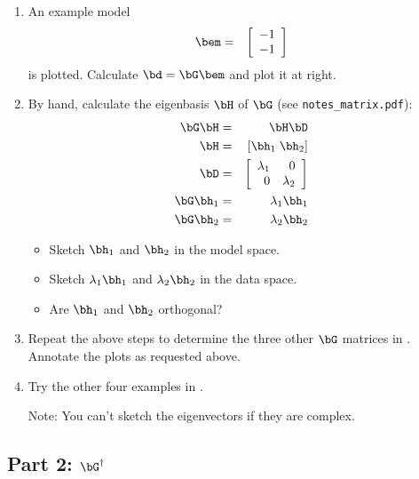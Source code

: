 \documentclass[11pt,titlepage,fleqn]{article}
\begin{document}
\begin{enumerate}
\item An example model
%
\begin{eqnarray}
\bem  &=& \left[ \begin{array}{c} -1 \\ -1 \end{array} \right]
\end{eqnarray}
%
is plotted. Calculate $\bd = \bG\bem$ and plot it at right.

\item By hand, calculate the eigenbasis $\bH$ of $\bG$ (see \verb+notes_matrix.pdf+):
%
\begin{eqnarray}
\bG\bH  &=& \bH \bD
\\
\bH &=& [\bh_1\;\bh_2]
\\
\bD &=& \left[ \begin{array}{rr}
     \lambda_1  &  0  \\
     0  &  \lambda_2  \\
\end{array} \right]
\\
\bG\bh_1 &=& \lambda_1\bh_1
\\
\bG\bh_2 &=& \lambda_2\bh_2
\end{eqnarray}
%
\begin{itemize}
\item Sketch $\bh_1$ and $\bh_2$ in the model space.
\item Sketch $\lambda_1\bh_1$ and $\lambda_2\bh_2$ in the data space.
\item Are $\bh_1$ and $\bh_2$ orthogonal?
\end{itemize}

\item Repeat the above steps to determine the three other $\bG$ matrices in . Annotate the plots as requested above.

\item Try the other four examples in .

Note: You can't sketch the eigenvectors if they are complex.

\end{enumerate}



\subsection*{Part 2: $\bG^{\dagger}$}
\end{document}
